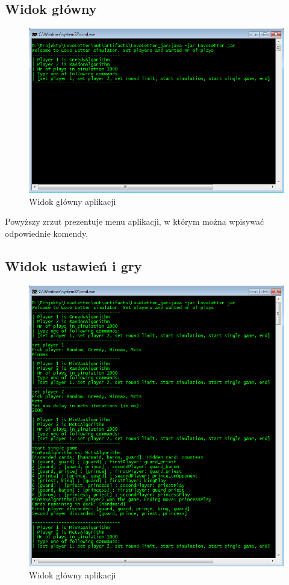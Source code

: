 \subsection*{Widok główny}
\begin{figure}[H]
	\centering
	\includegraphics[width=\textwidth]{Resources/cli.PNG}
	\caption{Widok główny aplikacji} 
	\label{fig:cli}
\end{figure}
Powyższy zrzut prezentuje menu aplikacji, w którym można wpisywać odpowiednie komendy.

\subsection*{Widok ustawień i gry}
\begin{figure}[H]
	\centering
	\includegraphics[width=\textwidth]{Resources/cli2.PNG}
	\caption{Widok główny aplikacji} 
	\label{fig:cli2}
\end{figure}

